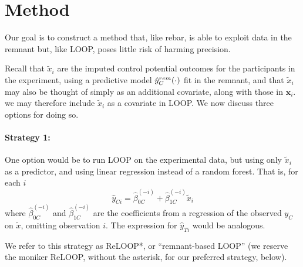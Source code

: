 \section{Method}
Our goal is to construct a method that, like rebar, is able to exploit data in the remnant but, like LOOP, poses little risk of harming precision.

Recall that
$\tilde{x}_{i}$ are the imputed control potential outcomes for the
participants in the experiment, using a predictive model
$\hat{y}_C^{rem}(\cdot)$ fit in the remnant, and that
$\tilde{x}_{i}$ may also be thought of simply as an additional
covariate, along with those in $\mathbf{x}_i$.
we may therefore include $\tilde{x}_{i}$ as a covariate in LOOP.  We now discuss
three options for doing so.



\paragraph{Strategy 1:}
One option would be to run LOOP on the experimental data, but using only $\tilde{x}_{i}$ as a predictor, and using linear regression instead of a random forest.  That is, for each $i$
\begin{equation}
\hat{y}_{Ci} = \hat{\beta}_{0C}^{(-i)} + \hat{\beta}_{1C}^{(-i)}\tilde{x}_{i}
\end{equation}
where  $\hat{\beta}_{0C}^{(-i)}$ and $\hat{\beta}_{1C}^{(-i)}$ are the
coefficients from a regression of the observed $y_C$ on $\tilde{x}$,
omitting observation $i$.  The expression for $\hat{y}_{Ti}$ would be
analogous.

We refer to this strategy as ReLOOP*, or ``remnant-based LOOP'' (we
reserve the moniker ReLOOP, without the asterisk, for our preferred
strategy, below).

